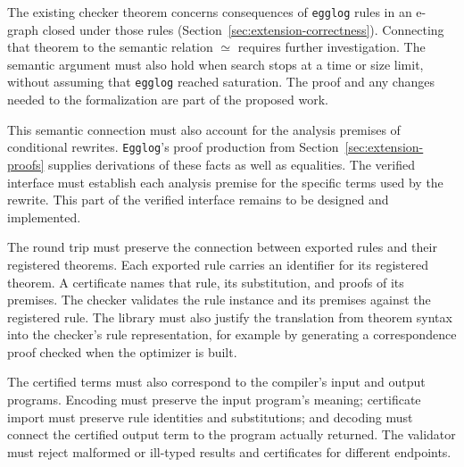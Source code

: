 The existing checker theorem concerns consequences of \texttt{egglog} rules
  in an e-graph closed under those rules (Section~\ref{sec:extension-correctness}).
Connecting that theorem to the semantic relation $\simeq$ requires further investigation.
The semantic argument must also hold when search stops at a time or size limit,
  without assuming that \texttt{egglog} reached saturation.
The proof and any changes needed to the formalization are part of the proposed work.

This semantic connection must also account for the analysis premises of conditional rewrites.
\texttt{Egglog}'s proof production from Section~\ref{sec:extension-proofs}
  supplies derivations of these facts as well as equalities.
The verified interface must establish each analysis premise for the specific terms
  used by the rewrite.
This part of the verified interface remains to be designed and implemented.

The round trip must preserve the connection between exported rules and their registered theorems.
Each exported rule carries an identifier for its registered theorem.
A certificate names that rule, its substitution, and proofs of its premises.
The checker validates the rule instance and its premises against the registered rule.
The library must also justify the translation from theorem syntax into the checker's rule representation,
  for example by generating a correspondence proof checked when the optimizer is built.

The certified terms must also correspond to the compiler's input and output programs.
Encoding must preserve the input program's meaning;
  certificate import must preserve rule identities and substitutions;
  and decoding must connect the certified output term to the program actually returned.
The validator must reject malformed or ill-typed results and certificates for different endpoints.

